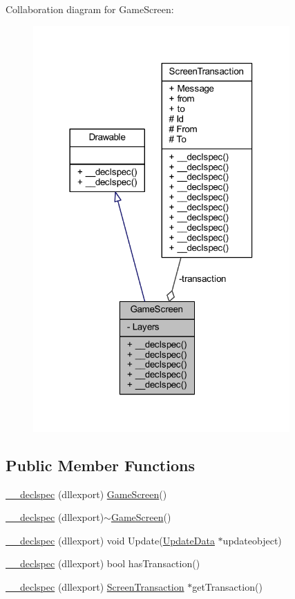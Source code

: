 Collaboration diagram for Game\-Screen\-:
\nopagebreak
\begin{figure}[H]
\begin{center}
\leavevmode
\includegraphics[width=278pt]{class_game_screen__coll__graph}
\end{center}
\end{figure}
\subsection*{Public Member Functions}
\begin{DoxyCompactItemize}
\item 
\hyperlink{class_game_screen_a41fb99405265eadec9712c99673a05f1}{\-\_\-\-\_\-declspec} (dllexport) \hyperlink{class_game_screen}{Game\-Screen}()
\item 
\hyperlink{class_game_screen_a940d1b9790ff4b737ee4c521d10a5e08}{\-\_\-\-\_\-declspec} (dllexport)$\sim$\hyperlink{class_game_screen}{Game\-Screen}()
\item 
\hyperlink{class_game_screen_abf3d28d386460d2de50ab89f2b6803ae}{\-\_\-\-\_\-declspec} (dllexport) void Update(\hyperlink{class_update_data}{Update\-Data} $\ast$updateobject)
\item 
\hyperlink{class_game_screen_ae0c4507a9836db3a91c596cfbc228a44}{\-\_\-\-\_\-declspec} (dllexport) bool has\-Transaction()
\item 
\hyperlink{class_game_screen_a6956b33306f1fd55ed252479ccc9d123}{\-\_\-\-\_\-declspec} (dllexport) \hyperlink{class_screen_transaction}{Screen\-Transaction} $\ast$get\-Transaction()
\end{DoxyCompactItemize}
